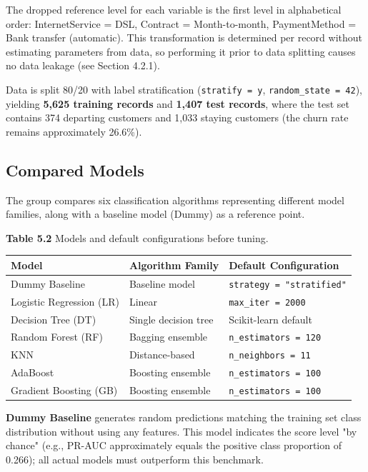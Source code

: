 The dropped reference level for each variable is the first level in alphabetical order: InternetService = DSL, Contract = Month-to-month, PaymentMethod = Bank transfer (automatic). This transformation is determined per record without estimating parameters from data, so performing it prior to data splitting causes no data leakage (see Section 4.2.1).

Data is split 80/20 with label stratification (\texttt{stratify = y}, \texttt{random\_state = 42}), yielding \textbf{5,625 training records} and \textbf{1,407 test records}, where the test set contains 374 departing customers and 1,033 staying customers (the churn rate remains approximately 26.6\%).

\subsection{Compared Models}

The group compares six classification algorithms representing different model families, along with a baseline model (Dummy) as a reference point.

\vspace{0.5em}
\noindent\textbf{Table 5.2} Models and default configurations before tuning.

\begin{center}
\small
\begin{tabularx}{\textwidth}{l l X}
\toprule
\textbf{Model} & \textbf{Algorithm Family} & \textbf{Default Configuration} \\
\midrule
Dummy Baseline & Baseline model & \texttt{strategy = "stratified"} \\
Logistic Regression (LR) & Linear & \texttt{max\_iter = 2000} \\
Decision Tree (DT) & Single decision tree & Scikit-learn default \\
Random Forest (RF) & Bagging ensemble & \texttt{n\_estimators = 120} \\
KNN & Distance-based & \texttt{n\_neighbors = 11} \\
AdaBoost & Boosting ensemble & \texttt{n\_estimators = 100} \\
Gradient Boosting (GB) & Boosting ensemble & \texttt{n\_estimators = 100} \\
\bottomrule
\end{tabularx}
\end{center}

\textbf{Dummy Baseline} generates random predictions matching the training set class distribution without using any features. This model indicates the score level "by chance" (e.g., PR-AUC approximately equals the positive class proportion of 0.266); all actual models must outperform this benchmark.


